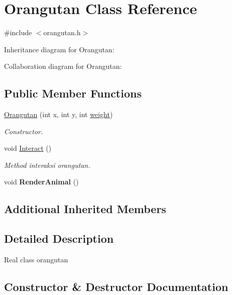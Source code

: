 \hypertarget{classOrangutan}{}\section{Orangutan Class Reference}
\label{classOrangutan}


{\ttfamily \#include $<$orangutan.\+h$>$}



Inheritance diagram for Orangutan\+:


Collaboration diagram for Orangutan\+:
\subsection*{Public Member Functions}
\begin{DoxyCompactItemize}
\item 
\hyperlink{classOrangutan_aa7695826be5c53bc9d3e751676039466}{Orangutan} (int x, int y, int \hyperlink{classAnimal_a9a3b22f243f7109c57f36b3c660feb6e}{weight})
\begin{DoxyCompactList}\small\item\em Constructor. \end{DoxyCompactList}\item 
void \hyperlink{classOrangutan_add3652060fa3cfb507fc1ef6f150ac44}{Interact} ()\hypertarget{classOrangutan_add3652060fa3cfb507fc1ef6f150ac44}{}\label{classOrangutan_add3652060fa3cfb507fc1ef6f150ac44}

\begin{DoxyCompactList}\small\item\em Method interaksi orangutan. \end{DoxyCompactList}\item 
void {\bfseries Render\+Animal} ()\hypertarget{classOrangutan_a8a8926bb7df1936a8a29529fd9b51490}{}\label{classOrangutan_a8a8926bb7df1936a8a29529fd9b51490}

\end{DoxyCompactItemize}
\subsection*{Additional Inherited Members}


\subsection{Detailed Description}
Real class orangutan 

\subsection{Constructor \& Destructor Documentation}
